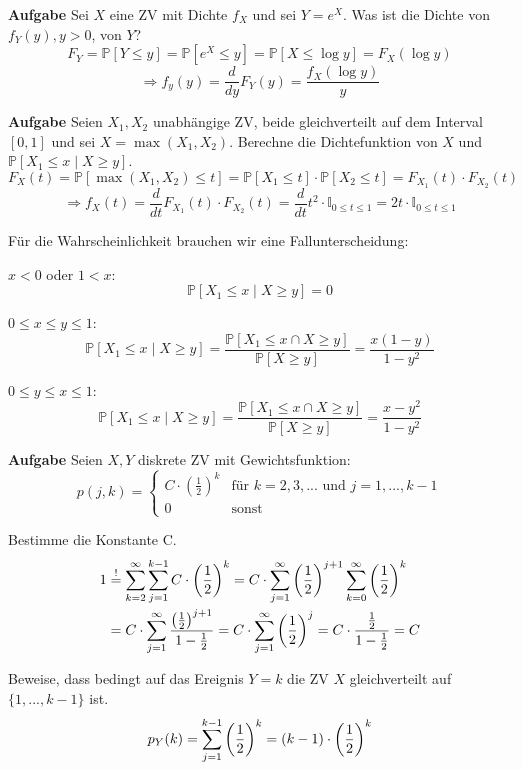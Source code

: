 \textbf{Aufgabe}
Sei $X$ eine ZV mit Dichte $f_X$ und sei $Y = e^X$. Was ist die Dichte von $f_Y(y), y>0$, von $Y$?
$$F_Y = \mathbb{P}[Y \leq y] = \mathbb{P}[e^X \leq y] = \mathbb{P}[X \leq \log y] = F_X(\log y)$$ 
$$\Rightarrow f_y(y) = \frac{d}{dy}F_Y(y) = \frac{f_X(\log y)}{y}$$

\hrulefill

\textbf{Aufgabe}
Seien $X_1, X_2$ unabhängige ZV, beide gleichverteilt auf dem Interval $[0,1]$ und sei $X = \max (X_1, X_2)$. Berechne die Dichtefunktion von $X$ und $\mathbb{P}[X_1 \leq x \; | \; X \geq y]$.
$$F_X(t) = \mathbb{P}[\max(X_1, X_2) \leq t] = \mathbb{P}[X_1 \leq t] \cdot \mathbb{P}[X_2 \leq t] = F_{X_1}(t) \cdot F_{X_2}(t)$$
$$\Rightarrow f_X(t) = \frac{d}{dt} F_{X_1}(t) \cdot F_{X_2}(t) = \frac{d}{dt} t^2 \cdot \mathbb{I}_{0 \leq t \leq 1} = 2t \cdot \mathbb{I}_{0 \leq t \leq 1}$$

Für die Wahrscheinlichkeit brauchen wir eine Fallunterscheidung: \smallskip

$x < 0$ oder $1 < x$:
$$\mathbb{P}[X_1 \leq x \; | \; X \geq y] = 0$$

$0 \leq x \leq y \leq 1$:
$$\mathbb{P}[X_1 \leq x \; | \; X \geq y] = \frac{\mathbb{P}[X_1 \leq x \cap X \geq y]}{\mathbb{P}[X \geq y]} = \frac{x(1-y)}{1 - y^2}$$

$0 \leq y \leq x \leq 1$:
$$\mathbb{P}[X_1 \leq x \; | \; X \geq y] = \frac{\mathbb{P}[X_1 \leq x \cap X \geq y]}{\mathbb{P}[X \geq y]} = \frac{x - y^2}{1 - y^2}$$

\hrulefill

\textbf{Aufgabe}
Seien $X,Y$ diskrete ZV mit Gewichtsfunktion:
$$p(j,k) = \begin{cases}
	C \cdot (\frac{1}{2})^k & \text{für } k = 2,3,... \text{ und } j = 1,...,k-1  \\
	0 & \text{sonst}
\end{cases}$$

Bestimme die Konstante C.
\begin{align*}
	1 &\stackrel{!}{=} \sum\limits_{k=2}^\infty \sum\limits_{j=1}^{k-1} C \cdot \left( \frac{1}{2} \right)^k = C \cdot \sum\limits_{j=1}^\infty \left( \frac{1}{2} \right)^{j+1} \sum\limits_{k=0}^\infty \left( \frac{1}{2} \right)^k \\
	&= C \cdot \sum\limits_{j=1}^\infty \frac{\left( \frac{1}{2} \right)^{j+1}}{1 - \frac{1}{2}} = C \cdot \sum\limits_{j=1}^\infty \left( \frac{1}{2} \right)^j = C \cdot \frac{\frac{1}{2}}{1 - \frac{1}{2}} = C
\end{align*}

Beweise, dass bedingt auf das Ereignis $Y = k$ die ZV $X$ gleichverteilt auf $\{ 1, ..., k-1 \}$ ist.
$$p_Y(k) = \sum\limits_{j=1}^{k-1} \left( \frac{1}{2} \right)^k = (k-1) \cdot \left( \frac{1}{2} \right)^k $$

